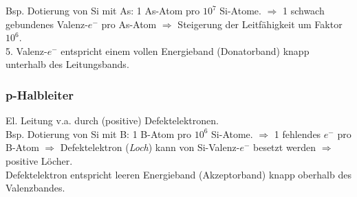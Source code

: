 Bsp. Dotierung von Si mit As: 1 As-Atom pro $10^7$ Si-Atome. $\Rightarrow$ 1 schwach gebundenes Valenz-$e^-$ pro As-Atom $\Rightarrow$ Steigerung der Leitfähigkeit um Faktor $10^6$. \\

5. Valenz-$e^-$ entspricht einem vollen Energieband (Donatorband) knapp unterhalb des Leitungsbands. \\

\subsubsection{p-Halbleiter}
El. Leitung v.a. durch (positive) Defektelektronen. \\

Bsp. Dotierung von Si mit B: 1 B-Atom pro $10^6$ Si-Atome. $\Rightarrow$ 1 fehlendes $e^-$ pro B-Atom $\Rightarrow$ Defektelektron (\emph{Loch}) kann von Si-Valenz-$e^-$ besetzt werden $\Rightarrow$ positive Löcher. \\

Defektelektron entspricht leeren Energieband (Akzeptorband) knapp oberhalb des Valenzbandes.